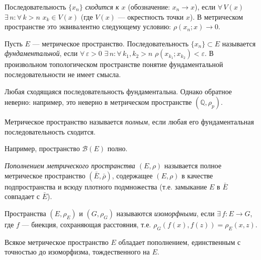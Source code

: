 \documentclass[10pt]{article}
\begin{document}
\begin{df}
Последовательность $\{x_n\}$ \emph{сходится к $x$} (обозначение:
$x_n\to x$), если $\forall\, V(x)$ $\exists\,n:\forall\,k>n$ $x_k\in
V(x)$ (где $V(x)$ --- окрестность точки $x$). В метрическом
пространстве это эквивалентно следующему условию: $\rho(x_n;x)\to
0$.
\end{df}

\begin{df}
Пусть $E$ --- метрическое пространство. Последовательность
$\{x_n\}\subset E$ называется \emph{фундаментальной}, если
$\forall\,\varepsilon>0$ $\exists\,n:\forall\,k_1,k_2>n$
$\rho(x_{k_1};x_{k_2})<\varepsilon$. В произвольном топологическом
пространстве понятие фундаментальной последовательности не имеет
смысла.
\end{df}

\begin{note}
Любая сходящаяся последовательность фундаментальна. Однако обратное
неверно: например, это неверно в метрическом пространстве
$(\mathbb{Q},\rho_p)$.
\end{note}

\begin{df}
Метрическое пространство называется \emph{полным}, если любая его
фундаментальная последовательность сходится.

Например, пространство $\mathcal{B}(E)$ полно.
\end{df}

\begin{df}
\emph{Пополнением метрического пространства $(E,\rho)$} называется
полное метрическое пространство $(\bar{E},\bar{\rho})$, содержащее
$(E,\rho)$ в качестве подпространства и всюду плотного подмножества
(т.е. замыкание $E$ в $\bar{E}$ совпадает с $\bar{E}$).
\end{df}

\begin{df}
Пространства $(E,\rho_E)$ и $(G,\rho_G)$ называются
\emph{изоморфными}, если $\exists\,f\colon E\to G$, где $f$ ---
биекция, сохраняющая расстояния, т.е.
$\rho_G(f(x),f(z))=\rho_E(x,z)$.
\end{df}



\begin{theorem}
Всякое метрическое пространство $E$ обладает пополнением,
единственным с точностью до изоморфизма, тождественного на $E$.
\end{theorem}
\end{document}
